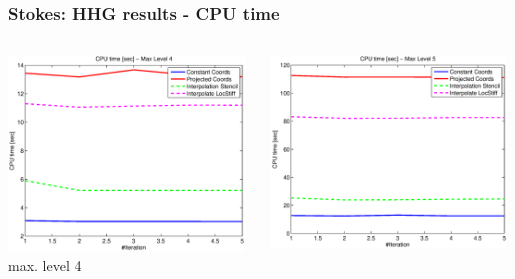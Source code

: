 \documentclass[t,compress=false,usepdftitle=false]{beamer}
\begin{document}
\begin{frame}\frametitle{Stokes: HHG results - CPU time}

\begin{columns}[T] 
\begin{column}[T]{4.3cm} 
  \centering
  \includegraphics[width=0.98\textwidth]{spherestokes_cpuTime_level4}\\
  max. level 4
\end{column}\hfill
\begin{column}[T]{4.3cm} 
  \centering
  \includegraphics[width=0.98\textwidth]{spherestokes_cpuTime_level5}\\

\end{column}
\end{columns}
\end{frame}
\end{document}

